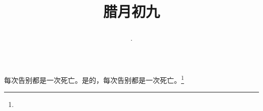 \title{\date[d=19,m=1,y=2024][year:cn-y,年,month:cn,day:cn,日,·,weekday]·腊月初九 }
每次告别都是一次死亡。是的，每次告别都是一次死亡。\footnote{ }

